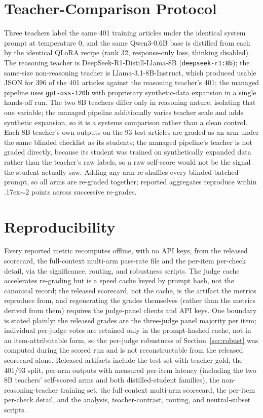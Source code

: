 \documentclass[10pt,journal]{IEEEtran}
\begin{document}
\section{Teacher-Comparison Protocol}\label{app:teachers}
Three teachers label the same 401 training articles under the identical system prompt at temperature 0, and the same Qwen3-0.6B base is distilled from each by the identical QLoRA recipe (rank 32, response-only loss, thinking disabled). The reasoning teacher is DeepSeek-R1-Distill-Llama-8B (\texttt{deepseek-r1:8b}); the same-size non-reasoning teacher is Llama-3.1-8B-Instruct, which produced usable JSON for 396 of the 401 articles against the reasoning teacher's 401; the managed pipeline uses \texttt{gpt-oss-120b} with proprietary synthetic-data expansion in a single hands-off run. The two 8B teachers differ only in reasoning nature, isolating that one variable; the managed pipeline additionally varies teacher scale and adds synthetic expansion, so it is a systems comparison rather than a clean control. Each 8B teacher's own outputs on the 93 test articles are graded as an arm under the same blinded checklist as its students; the managed pipeline's teacher is not graded directly, because its student was trained on synthetically expanded data rather than the teacher's raw labels, so a raw self-score would not be the signal the student actually saw. Adding any arm re-shuffles every blinded batched prompt, so all arms are re-graded together; reported aggregates reproduce within {\raise.17ex\hbox{$\scriptstyle\sim$}}2 points across successive re-grades.

\section{Reproducibility}\label{app:repro}
Every reported metric recomputes offline, with no API keys, from the released scorecard, the full-context multi-arm pass-rate file and the per-item per-check detail, via the significance, routing, and robustness scripts. The judge cache accelerates re-grading but is a speed cache keyed by prompt hash, not the canonical record; the released scorecard, not the cache, is the artifact the metrics reproduce from, and regenerating the grades themselves (rather than the metrics derived from them) requires the judge-panel clients and API keys. One boundary is stated plainly: the released grades are the three-judge panel majority per item; individual per-judge votes are retained only in the prompt-hashed cache, not in an item-attributable form, so the per-judge robustness of Section~\ref{sec:robust} was computed during the scored run and is not reconstructable from the released scorecard alone. Released artifacts include the test set with teacher gold, the 401/93 split, per-arm outputs with measured per-item latency (including the two 8B teachers' self-scored arms and both distilled-student families), the non-reasoning-teacher training set, the full-context multi-arm scorecard, the per-item per-check detail, and the analysis, teacher-contrast, routing, and neutral-subset scripts.
\end{document}
